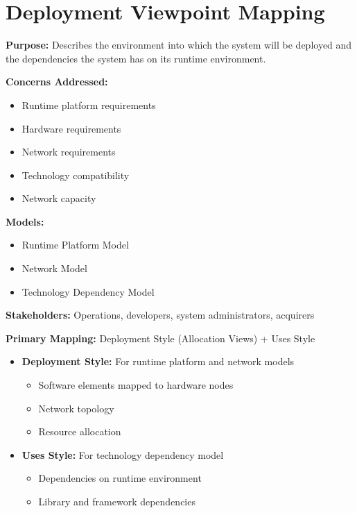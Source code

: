 \documentclass[11pt]{article}
\begin{document}
\section{Deployment Viewpoint Mapping}

\begin{rwbox}
\textbf{Purpose:} Describes the environment into which the system will be deployed and the dependencies the system has on its runtime environment.

\textbf{Concerns Addressed:}
\begin{itemize}[nosep]
    \item Runtime platform requirements
    \item Hardware requirements
    \item Network requirements
    \item Technology compatibility
    \item Network capacity
\end{itemize}

\textbf{Models:}
\begin{itemize}[nosep]
    \item Runtime Platform Model
    \item Network Model
    \item Technology Dependency Model
\end{itemize}

\textbf{Stakeholders:} Operations, developers, system administrators, acquirers
\end{rwbox}

\begin{vbbox}
\textbf{Primary Mapping:} Deployment Style (Allocation Views) + Uses Style

\begin{itemize}
    \item \textbf{Deployment Style:} For runtime platform and network models
    \begin{itemize}[nosep]
        \item Software elements mapped to hardware nodes
        \item Network topology
        \item Resource allocation
    \end{itemize}
    \item \textbf{Uses Style:} For technology dependency model
    \begin{itemize}[nosep]
        \item Dependencies on runtime environment
        \item Library and framework dependencies
    \end{itemize}
\end{itemize}
\end{vbbox}
\end{document}
